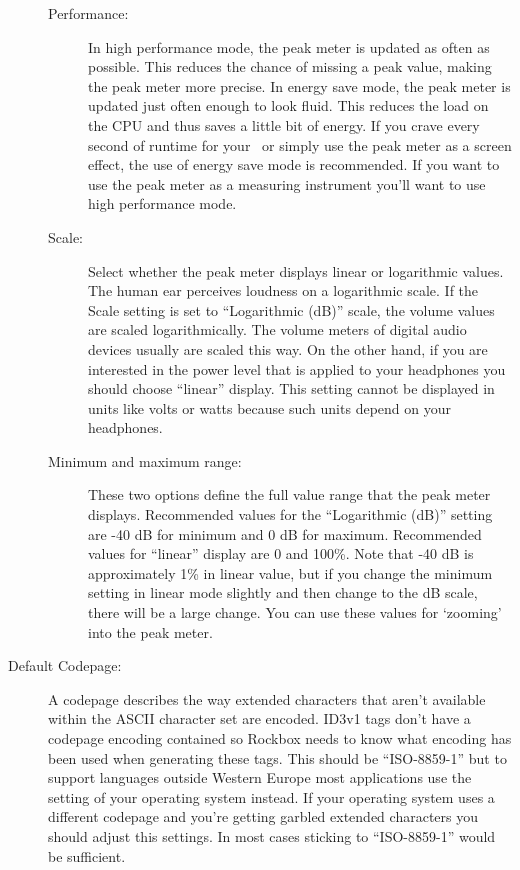 \begin{description}
{\begin{description}
      \item[Performance:]
        In high performance mode, the peak meter is updated as often as 
        possible. This reduces the chance of missing a peak value, making 
        the peak meter more precise. In energy save mode, the peak meter is 
        updated just often enough to look fluid.  This reduces the load on 
        the CPU and thus saves a little bit of energy.  If you crave every 
        second of runtime for your \dap\ or simply use the peak meter as a 
        screen effect, the use of energy save mode is recommended.  If you 
        want to use the peak meter as a measuring instrument you'll want to 
        use high performance mode.  
      \item[Scale:]
        Select whether the peak meter displays linear or logarithmic values. 
        The human ear perceives loudness on a logarithmic scale.  If the 
        Scale setting is set to ``Logarithmic (dB)'' scale, the volume values 
        are scaled logarithmically.  The volume meters of digital audio 
        devices usually are scaled this way.  On the other hand, if you 
        are interested in the power level that is applied to your headphones 
        you should choose ``linear'' display.  This setting cannot be 
        displayed in units like volts or watts because such units depend 
        on your headphones.
      \item[Minimum and maximum range:]
        These two options define the full value range that the peak meter 
        displays. Recommended values for the ``Logarithmic (dB)'' setting 
        are {}-40 dB for minimum and 0 dB for maximum. Recommended values 
        for ``linear'' display are 0 and 100\%. Note that {}-40 dB is 
        approximately 1\% in linear value, but if you change the minimum 
        setting in linear mode slightly and then change to the dB scale, 
        there will be a large change. You can use these values for `zooming' 
        into the peak meter.
      \end{description}
    }
    \item[Default Codepage:]
      A codepage describes the way extended characters that aren't available
      within the ASCII character set are encoded. ID3v1 tags don't have a 
      codepage encoding contained so Rockbox needs to know what encoding has
      been used when generating these tags. This should be ``ISO-8859-1'' but
      to support languages outside Western Europe most applications use
      the setting of your operating system instead. If your operating system
      uses a different codepage and you're getting garbled extended characters
      you should adjust this settings. In most cases sticking to 
      ``ISO-8859-1'' would be sufficient.
  \end{description}
